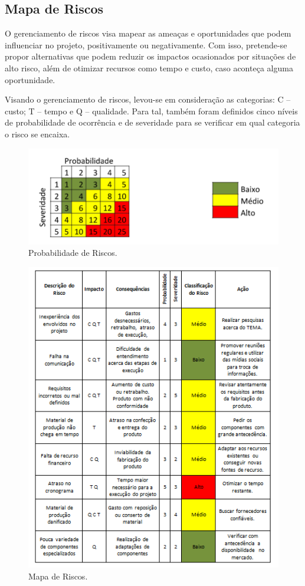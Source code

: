 \subsection{Mapa de Riscos}

O gerenciamento de riscos visa mapear as ameaças e oportunidades que podem influenciar no projeto, positivamente ou negativamente. Com isso, pretende-se propor alternativas que podem reduzir os impactos ocasionados por situações de alto risco, além de otimizar recursos como tempo e custo, caso aconteça alguma oportunidade.

Visando o gerenciamento de riscos, levou-se em consideração as categorias: C – custo; T – tempo e Q – qualidade. Para tal, também foram definidos cinco níveis de probabilidade de ocorrência e de severidade para se verificar em qual categoria o risco se encaixa.

\begin{figure}[!ht]
	\centering
	\label{risco1}
	\includegraphics[keepaspectratio=true,scale=0.8]{figuras/risco1.PNG}
	\caption{Probabilidade de Riscos.}
\end{figure}

\begin{figure}[!ht]
	\centering
	\label{risco2}
	\includegraphics[keepaspectratio=true,scale=0.8]{figuras/risco2.PNG}
	\caption{Mapa de Riscos.}
\end{figure}

